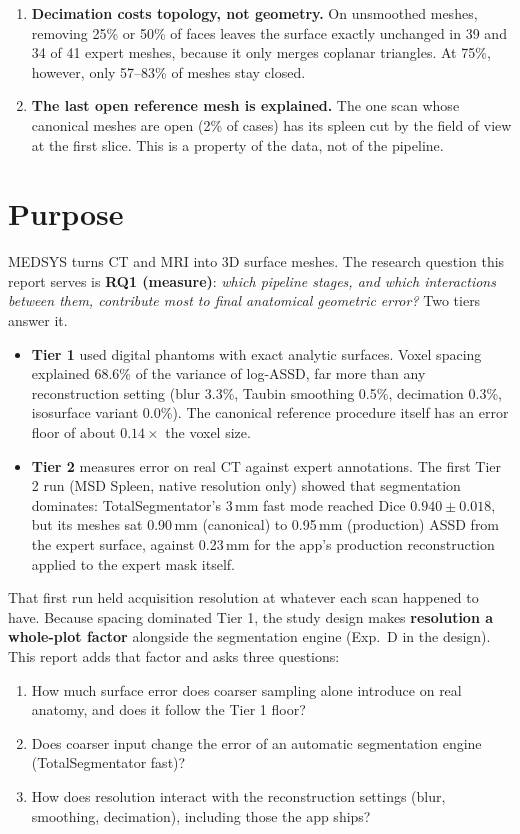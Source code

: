 \documentclass[10pt,a4paper]{article}
\begin{document}
\begin{tcolorbox}
\begin{enumerate}[leftmargin=1.4em,itemsep=3pt]
\item \textbf{Decimation costs topology, not geometry.} On unsmoothed meshes, removing 25\% or 50\% of faces leaves the surface exactly unchanged in 39 and 34 of 41 expert meshes, because it only merges coplanar triangles. At 75\%, however, only 57--83\% of meshes stay closed.
\item \textbf{The last open reference mesh is explained.} The one scan whose canonical meshes are open (2\% of cases) has its spleen cut by the field of view at the first slice. This is a property of the data, not of the pipeline.
\end{enumerate}
\end{tcolorbox}

\section{Purpose}

MEDSYS turns CT and MRI into 3D surface meshes. The research question this report serves is \textbf{RQ1 (measure)}: \emph{which pipeline stages, and which interactions between them, contribute most to final anatomical geometric error?} Two tiers answer it.

\begin{itemize}
\item \textbf{Tier 1} used digital phantoms with exact analytic surfaces. Voxel spacing explained 68.6\% of the variance of log-ASSD, far more than any reconstruction setting (blur 3.3\%, Taubin smoothing 0.5\%, decimation 0.3\%, isosurface variant 0.0\%). The canonical reference procedure itself has an error floor of about $0.14\times$ the voxel size.
\item \textbf{Tier 2} measures error on real CT against expert annotations. The first Tier 2 run (MSD Spleen, native resolution only) showed that segmentation dominates: TotalSegmentator's 3\,mm fast mode reached Dice $0.940\pm0.018$, but its meshes sat 0.90\,mm (canonical) to 0.95\,mm (production) ASSD from the expert surface, against 0.23\,mm for the app's production reconstruction applied to the expert mask itself.
\end{itemize}

That first run held acquisition resolution at whatever each scan happened to have. Because spacing dominated Tier 1, the study design makes \textbf{resolution a whole-plot factor} alongside the segmentation engine (Exp.~D in the design). This report adds that factor and asks three questions:
\begin{enumerate}[label=\textbf{Q\arabic*}]
\item How much surface error does coarser sampling alone introduce on real anatomy, and does it follow the Tier 1 floor?
\item Does coarser input change the error of an automatic segmentation engine (TotalSegmentator fast)?
\item How does resolution interact with the reconstruction settings (blur, smoothing, decimation), including those the app ships?
\end{enumerate}
\end{document}
